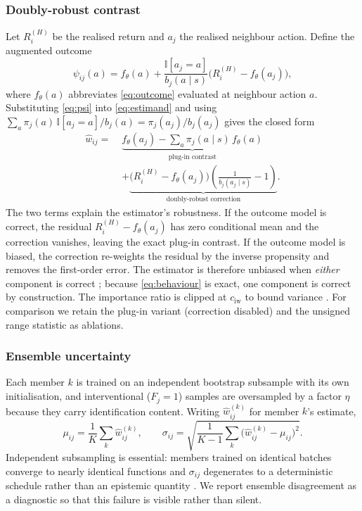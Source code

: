 \documentclass[conference]{IEEEtran}
\begin{document}
\subsubsection{Doubly-robust contrast}
Let $R_i^{(H)}$ be the realised return and $a_j$ the realised neighbour action. Define the augmented outcome
\begin{equation}
\psi_{ij}(a)=f_{\theta}(a)+\frac{\mathbb{I}[a_j=a]}{b_j(a\mid s)}\Big(R_i^{(H)}-f_{\theta}(a_j)\Big),
\label{eq:psi}
\end{equation}
where $f_\theta(a)$ abbreviates \eqref{eq:outcome} evaluated at neighbour action $a$. Substituting \eqref{eq:psi} into \eqref{eq:estimand} and using $\sum_a \pi_j(a)\,\mathbb{I}[a_j=a]/b_j(a)=\pi_j(a_j)/b_j(a_j)$ gives the closed form
\begin{equation}
\begin{aligned}
\hat{w}_{ij}=\;&\underbrace{f_{\theta}(a_j)-\textstyle\sum_{a}\pi_j(a\mid s)\,f_{\theta}(a)}_{\text{plug-in contrast}}\\
&+\underbrace{\Big(R_i^{(H)}-f_{\theta}(a_j)\Big)\left(\frac{1}{b_j(a_j\mid s)}-1\right)}_{\text{doubly-robust correction}} .
\end{aligned}
\label{eq:dr}
\end{equation}
The two terms explain the estimator's robustness. If the outcome model is correct, the residual $R_i^{(H)}-f_\theta(a_j)$ has zero conditional mean and the correction vanishes, leaving the exact plug-in contrast. If the outcome model is biased, the correction re-weights the residual by the inverse propensity and removes the first-order error. The estimator is therefore unbiased when \emph{either} component is correct \cite{jiang2016dr}; because \eqref{eq:behaviour} is exact, one component is correct by construction. The importance ratio is clipped at $c_{\mathrm{iw}}$ to bound variance \cite{thomas2016hcope}. For comparison we retain the plug-in variant (correction disabled) and the unsigned range statistic as ablations.

\subsubsection{Ensemble uncertainty}
Each member $k$ is trained on an independent bootstrap subsample with its own initialisation, and interventional ($F_j=1$) samples are oversampled by a factor $\eta$ because they carry identification content. Writing $\hat{w}^{(k)}_{ij}$ for member $k$'s estimate,
\begin{equation}
\mu_{ij}=\frac{1}{K}\sum_{k}\hat{w}^{(k)}_{ij},
\qquad
\sigma_{ij}=\sqrt{\frac{1}{K-1}\sum_{k}\big(\hat{w}^{(k)}_{ij}-\mu_{ij}\big)^{2}} .
\label{eq:ensemble}
\end{equation}
Independent subsampling is essential: members trained on identical batches converge to nearly identical functions and $\sigma_{ij}$ degenerates to a deterministic schedule rather than an epistemic quantity \cite{lakshminarayanan2017ensembles}. We report ensemble disagreement as a diagnostic so that this failure is visible rather than silent.
\end{document}

